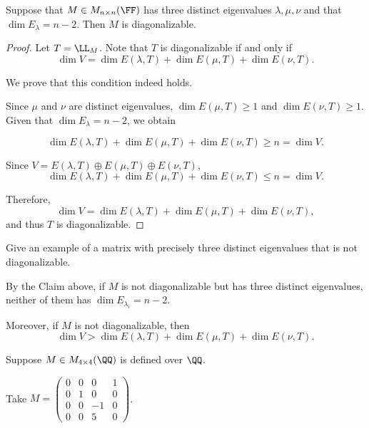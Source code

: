 \documentclass[11pt]{scrartcl}
\begin{document}
\begin{linenumbers}
  \begin{claim*}
    Suppose that $M\in M_{n\times n}(\FF)$ has three distinct
    eigenvalues $\lambda, \mu, \nu$ and that
    $\dim E_{\lambda} = n - 2$. Then $M$ is diagonalizable.
  \end{claim*}

  \begin{proof}
    Let $T = \LL_{M}$.
    Note that $T$ is diagonalizable if and only if
    \[\dim V = \dim E(\lambda, T) + \dim E(\mu, T) + \dim E(\nu, T).\]

    We prove that this condition indeed holds.

    Since $\mu$ and $\nu$ are distinct eigenvalues,
    $\dim E(\mu, T) \geq 1$ and $\dim E(\nu, T) \geq 1$. Given that
    $\dim E_{\lambda} = n-2$, we obtain

    \[ \dim E(\lambda, T) + \dim E(\mu, T) + \dim E(\nu, T) \geq n = \dim V.\]

    Since $V = E(\lambda, T) \oplus E(\mu, T) \oplus E(\nu, T)$,
    \[\dim E(\lambda, T) + \dim E(\mu, T) + \dim E(\nu, T) \leq n =
      \dim V.\]

    Therefore,
    \[\dim V = \dim E(\lambda, T) + \dim E(\mu, T) + \dim E(\nu, T),\]
    and thus $T$ is diagonalizable.
  \end{proof}

  \begin{problem*}
    Give an example of a matrix with precisely three distinct
    eigenvalues that is not diagonalizable.
  \end{problem*}

  \begin{soln}
    By the Claim above, if $M$ is not diagonalizable but has three
    distinct eigenvalues, neither of them has
    $\dim E_{\lambda_{i}} = n - 2$.

    Moreover, if $M$ is not diagonalizable, then
    \[\dim V > \dim E(\lambda, T) + \dim E(\mu, T) + \dim E(\nu, T).\]

    Suppose $M \in M_{4 \times 4}(\QQ)$ is defined over $\QQ$.

    Take $M =
    \begin{pmatrix}
      0 & 0 & 0  & 1 \\
      0 & 1 & 0  & 0 \\
      0 & 0 & -1 & 0 \\
      0 & 0 & 5 & 0
    \end{pmatrix}
    $.


\end{soln}
\end{linenumbers}
\end{document}
